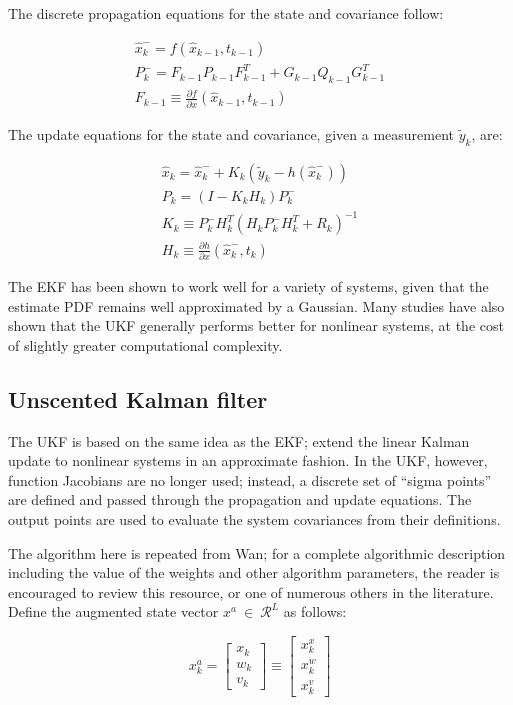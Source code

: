 \documentclass[]{article}
\begin{document}
The discrete propagation equations for the state and covariance follow:

\begin{align}
\hat{x}_{k}^- = f(\hat{x}_{k-1},t_{k-1}) \\
P_{k}^- = F_{k-1}P_{k-1}F_{k-1}^T + G_{k-1}Q_{k-1}G_{k-1}^T \\
F_{k-1} \equiv \frac{\partial f}{\partial x} (\hat{x}_{k-1},t_{k-1})
\end{align}

The update equations for the state and covariance, given a measurement $\tilde{y}_k$, are:

\begin{align}
\hat{x}_k = \hat{x}_k^- + K_k(\tilde{y}_k-h(\hat{x}_k^-)) \\
P_k = (I-K_kH_k)P_k^- \\
K_k \equiv P_k^- H_k^T (H_k P_k^- H_k^T + R_k)^{-1} \\
H_k \equiv \frac{\partial h}{\partial x} (\hat{x}_k^-,t_k)
\end{align}

The EKF has been shown to work well for a variety of systems, given that the estimate PDF remains well approximated by a Gaussian. Many studies have also shown that the UKF generally performs better for nonlinear systems, at the cost of slightly greater computational complexity.

\subsection{Unscented Kalman filter}

The UKF is based on the same idea as the EKF; extend the linear Kalman update to nonlinear systems in an approximate fashion. In the UKF, however, function Jacobians are no longer used; instead, a discrete set of ``sigma points'' are defined and passed through the propagation and update equations. The output points are used to evaluate the system covariances from their definitions.

The algorithm here is repeated from Wan\cite{wan2000}; for a complete algorithmic description including the value of the weights and other algorithm parameters, the reader is encouraged to review this resource, or one of numerous others in the literature. Define the augmented state vector $x^a \ \in \ \mathcal{R}^L$ as follows:

\begin{equation}
x^a_k = \begin{bmatrix}
x_k \\w_k \\v_k
\end{bmatrix} \equiv \begin{bmatrix}
x^x_k \\x^w_k \\x^v_k
\end{bmatrix}
\label{eq:xaug_ukf}
\end{equation}
\end{document}
